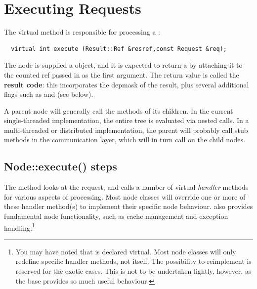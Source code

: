 \chapter{Executing Requests}
  \label{chap:execute}

  The virtual  method is responsible for processing a
  \Request:
  
  \begin{verbatim}
  virtual int execute (Result::Ref &resref,const Request &req);
  \end{verbatim}
  
  \noindent The node is supplied a  object, and it is expected to return a
   by attaching it to the counted ref passed in as the first
  argument. The return value is called the {\bf result code}: this
  incorporates the depmask of the result, plus several additional flags such
  as  and  (see below).

  A parent node will generally call the  methods of its
  children. In the current single-threaded implementation, the entire tree
  is evaluated via nested  calls. In a multi-threaded or
  distributed implementation, the parent will probably call stub methods in
  the communication layer, which will in turn call  on the
  child nodes.


  
\section{Node::execute() steps}
   \label{sec:execute}
  
  
  The  method looks at the request, and calls a number
  of virtual {\em handler} methods for various aspects of processing. Most
  node classes will override one or more of these handler method(s) to
  implement their specific node behaviour.  also
  provides fundamental node functionality, such as cache management and
  exception handling.\footnote{You may have noted that  is
  declared virtual. Most node classes will only redefine specific handler
  methods, not  itself.  The possibility to reimplement
   is reserved for the exotic cases. This is not to be
  undertaken lightly, however, as the base  provides so
  much useful behaviour.}

